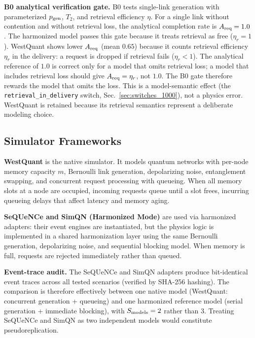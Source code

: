 \documentclass[aps,prapplied,reprint,superscriptaddress]{revtex4-2}
\newcommand{\Areq}{A_{\rm req}}
\begin{document}
\textbf{B0 analytical verification gate.} B0 tests single-link generation with parameterized $p_{\rm gen}$, $T_2$, and retrieval efficiency $\eta$. For a single link without contention and without retrieval loss, the analytical completion rate is $\Areq = 1.0$. The harmonized model passes this gate because it treats retrieval as free ($\eta_r = 1$). WestQuant shows lower $\Areq$ (mean $0.65$) because it counts retrieval efficiency $\eta_r$ in the delivery: a request is dropped if retrieval fails ($\eta_r < 1$). The analytical reference of $1.0$ is correct only for a model that omits retrieval loss; a model that includes retrieval loss should give $\Areq = \eta_r$, not $1.0$. The B0 gate therefore rewards the model that omits the loss. This is a model-semantic effect (the \texttt{retrieval\_in\_delivery} switch, Sec.~\ref{sec:switches_1000}), not a physics error. WestQuant is retained because its retrieval semantics represent a deliberate modeling choice.

\subsection{Simulator Frameworks}

\textbf{WestQuant} is the native simulator. It models quantum networks with per-node memory capacity $m$, Bernoulli link generation, depolarizing noise, entanglement swapping, and concurrent request processing with queueing. When all memory slots at a node are occupied, incoming requests queue until a slot frees, incurring queueing delays that affect latency and memory aging.

\textbf{SeQUeNCe and SimQN (Harmonized Mode)} are used via harmonized adapters: their event engines are instantiated, but the physics logic is implemented in a shared harmonization layer using the same Bernoulli generation, depolarizing noise, and sequential blocking model. When memory is full, requests are rejected immediately rather than queued.

\textbf{Event-trace audit.} The SeQUeNCe and SimQN adapters produce bit-identical event traces across all tested scenarios (verified by SHA-256 hashing). The comparison is therefore effectively between one native model (WestQuant: concurrent generation + queueing) and one harmonized reference model (serial generation + immediate blocking), with $S_{\rm models} = 2$ rather than 3. Treating SeQUeNCe and SimQN as two independent models would constitute pseudoreplication.
\end{document}
